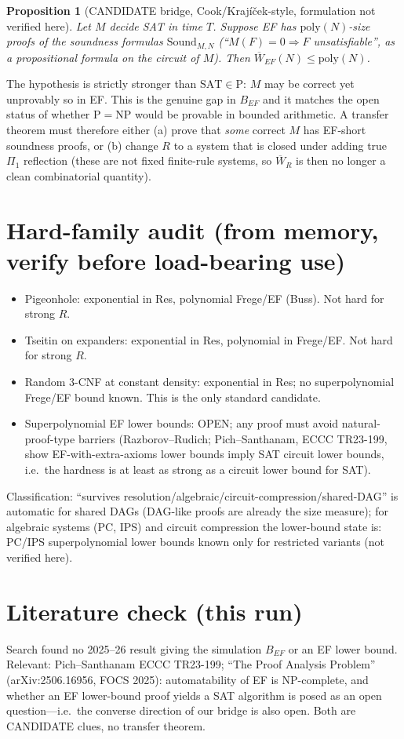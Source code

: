 \documentclass{article}
\newtheorem{prop}{Proposition}
\begin{document}
\begin{prop}[CANDIDATE bridge, Cook/Krajíček-style, formulation not verified here] Let $M$ decide SAT in time $T$. Suppose EF has $\mathrm{poly}(N)$-size proofs of the soundness formulas $\mathrm{Sound}_{M,N}$ (``$M(F)=0\Rightarrow F$ unsatisfiable'', as a propositional formula on the circuit of $M$). Then $\overline W_{EF}(N)\le\mathrm{poly}(N)$. 
\end{prop}
The hypothesis is strictly stronger than $\mathrm{SAT}\in\mathrm{P}$: $M$ may be correct yet unprovably so in EF. This is the genuine gap in $B_{EF}$ and it matches the open status of whether $\mathrm{P}=\mathrm{NP}$ would be provable in bounded arithmetic. A transfer theorem must therefore either (a) prove that \emph{some} correct $M$ has EF-short soundness proofs, or (b) change $R$ to a system that is closed under adding true $\Pi_1$ reflection (these are not fixed finite-rule systems, so $\overline W_R$ is then no longer a clean combinatorial quantity).

\section{Hard-family audit (from memory, verify before load-bearing use)}
\begin{itemize}
\item Pigeonhole: exponential in Res, polynomial Frege/EF (Buss). Not hard for strong $R$.
\item Tseitin on expanders: exponential in Res, polynomial in Frege/EF. Not hard for strong $R$.
\item Random 3-CNF at constant density: exponential in Res; no superpolynomial Frege/EF bound known. This is the only standard candidate.
\item Superpolynomial EF lower bounds: OPEN; any proof must avoid natural-proof-type barriers (Razborov--Rudich; Pich--Santhanam, ECCC TR23-199, show EF-with-extra-axioms lower bounds imply SAT circuit lower bounds, i.e.\ the hardness is at least as strong as a circuit lower bound for SAT).
\end{itemize}
Classification: ``survives resolution/algebraic/circuit-compression/shared-DAG'' is automatic for shared DAGs (DAG-like proofs are already the size measure); for algebraic systems (PC, IPS) and circuit compression the lower-bound state is: PC/IPS superpolynomial lower bounds known only for restricted variants (not verified here).

\section{Literature check (this run)}
Search found no 2025--26 result giving the simulation $B_{EF}$ or an EF lower bound. Relevant: Pich--Santhanam ECCC TR23-199; ``The Proof Analysis Problem'' (arXiv:2506.16956, FOCS 2025): automatability of EF is NP-complete, and whether an EF lower-bound proof yields a SAT algorithm is posed as an open question---i.e.\ the converse direction of our bridge is also open. Both are CANDIDATE clues, no transfer theorem.
\end{document}
